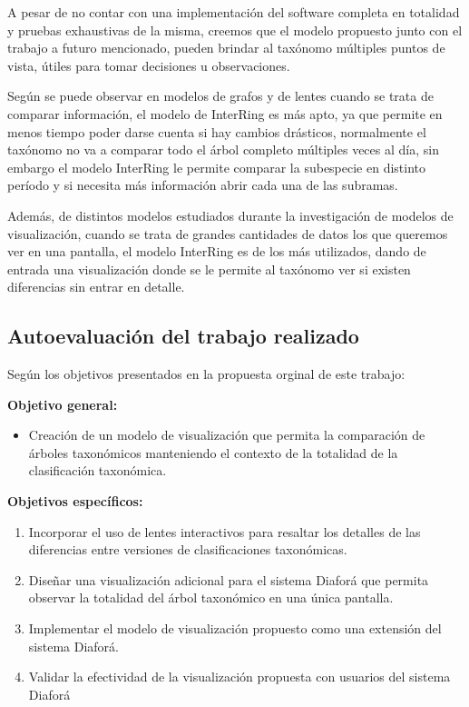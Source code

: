 \documentclass[journal]{IEEEtran}
\begin{document}
A pesar de no contar con una implementación del software completa en totalidad y pruebas exhaustivas de la misma, creemos que el modelo propuesto junto con el trabajo a futuro mencionado, pueden brindar al taxónomo múltiples puntos de vista, útiles para tomar decisiones u observaciones. 

Según se puede observar en modelos de grafos \cite{graph-explore} y de lentes \cite{lens-visual} cuando se trata de comparar información, el modelo de InterRing es más apto, ya que permite en menos tiempo poder darse cuenta si hay cambios drásticos, normalmente el taxónomo no va a comparar todo el árbol completo múltiples veces al día, sin embargo el modelo InterRing le permite comparar la subespecie en distinto período y si necesita más información abrir cada una de las subramas.

Además, de distintos modelos estudiados durante la investigación de modelos de visualización, cuando se trata de grandes cantidades de datos los que queremos ver en una pantalla, el modelo InterRing es de los más utilizados, dando de entrada una visualización donde se le permite al taxónomo ver si existen diferencias sin entrar en detalle.


\subsection{Autoevaluación del trabajo realizado }
Según los objetivos presentados en la propuesta orginal de este trabajo:

\textbf{Objetivo general:}
\begin{itemize}
\item Creación de un modelo de visualización que permita la comparación de árboles taxonómicos manteniendo el contexto de la totalidad de la clasificación taxonómica.
\end{itemize}
\hfill \break

\hfill \break
\textbf{Objetivos específicos:}
\begin{enumerate}
\item Incorporar el uso de lentes interactivos para resaltar los detalles de las diferencias entre versiones de clasificaciones taxonómicas.
\item Diseñar una visualización adicional para el sistema Diaforá que permita observar la totalidad del árbol taxonómico en una única pantalla.
\item Implementar el modelo de visualización propuesto como una extensión del sistema Diaforá. 
\item Validar la efectividad de la visualización propuesta con usuarios del sistema Diaforá
\end{enumerate}
\end{document}
